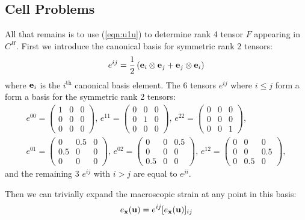 \documentclass[10pt]{article}
\begin{document}
\subsection{Cell Problems}
All that remains is to use (\ref{eqn:u1u}) to determine rank 4 tensor $F$
appearing in $C^H$. First we introduce the canonical basis for symmetric rank 2 tensors:
$$
e^{ij} = \frac{1}{2} \left({\bf e}_i \otimes {\bf e}_j + {\bf e}_j \otimes {\bf e}_i \right)
$$
where ${\bf e}_i$ is the $i^\text{th}$ canonical basis element.
The 6 tensors $e^{ij}$ where $i \le j$ form a form a basis for the symmetric rank 2 tensors:
\begin{gather*}
e^{00} =
\begin{pmatrix}
        1 & 0 & 0 \\
        0 & 0 & 0 \\
        0 & 0 & 0
\end{pmatrix},\,
e^{11} =
\begin{pmatrix}
        0 & 0 & 0 \\
        0 & 1 & 0 \\
        0 & 0 & 0
\end{pmatrix},\,
e^{22} =
\begin{pmatrix}
        0 & 0 & 0 \\
        0 & 0 & 0 \\
        0 & 0 & 1
\end{pmatrix}, \\
e^{01} =
\begin{pmatrix}
        0 & 0.5 & 0 \\
        0.5 & 0 & 0 \\
        0 & 0 & 0
\end{pmatrix},\,
e^{02} =
\begin{pmatrix}
        0 & 0 & 0.5 \\
        0 & 0 & 0 \\
        0.5 & 0 & 0
\end{pmatrix},\,
e^{12} =
\begin{pmatrix}
        0 & 0 & 0 \\
        0 & 0 & 0.5 \\
        0 & 0.5 & 0
\end{pmatrix},
\end{gather*}
and the remaining 3 $e^{ij}$ with $i > j$ are equal to $e^{ji}$.

Then we can trivially expand the macroscopic strain at any point in this basis:
$$
e_{\bf x}({\bf u}) = e^{ij} [e_{\bf x}({\bf u})]_{ij}
$$
\end{document}
